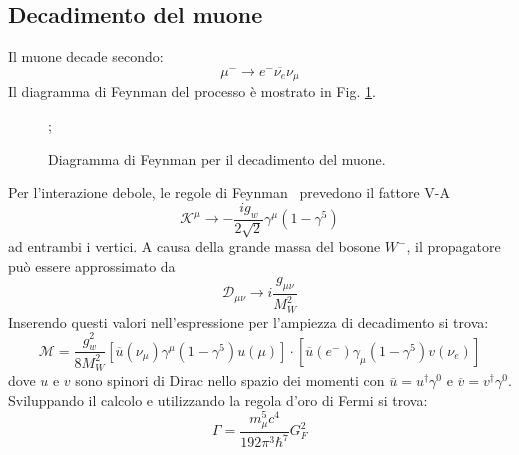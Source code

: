 \documentclass{subnucbo}
\begin{document}
\subsection{Decadimento del muone}
Il muone decade secondo:
\begin{equation}
        \mu^{-} \rightarrow e^{-} \overline{\nu_{e}} \nu_{\mu}
        \label{eq:muon_decay}
\end{equation}
Il diagramma di Feynman del processo è mostrato in Fig. \ref{fig:muon_decay}.
\begin{figure}[!h]
        \centering
        ;
        \caption{Diagramma di Feynman per il decadimento del muone.}
        \label{fig:muon_decay}
\end{figure}
Per l'interazione debole, le regole di Feynman~\cite{ref:griff} prevedono il fattore V-A
\begin{equation}
        \mathcal { K } ^ { \mu } \rightarrow - \frac { i g _ { w } } { 2 \sqrt { 2 } } \gamma ^ { \mu } \left( 1 - \gamma ^ { 5 } \right)
\end{equation}
ad entrambi i vertici. A causa della grande massa del bosone $W^{-}$, il propagatore può essere approssimato da
\begin{equation}
        \mathcal { D } _ { \mu \nu } \rightarrow i \frac { g _ { \mu \nu } } { M _ { W } ^ { 2 } }
        \label{eq:propagator}
\end{equation}
Inserendo questi valori nell'espressione per l'ampiezza di decadimento si trova:
\begin{equation}
        \mathcal { M } = \frac { g _ { w } ^ { 2 } } { 8 M _ { W } ^ { 2 } } \left[ \overline { u } \left( \nu _ { \mu } \right) \gamma ^ { \mu } \left( 1 - \gamma ^ { 5 } \right) u ( \mu ) \right] \cdot \left[ \overline { u } \left( e ^ { - } \right) \gamma _ { \mu } \left( 1 - \gamma ^ { 5 } \right) v \left( \nu _ { e } \right) \right]
        \label{eq:amplitude_muon}
\end{equation}
dove $u$ e $v$ sono spinori di Dirac nello spazio dei momenti con $\overline { u } = u ^ { \dagger } \gamma ^ { 0 }$ e $\overline { v } = v ^ { \dagger } \gamma ^ { 0 }$. Sviluppando il calcolo e utilizzando la regola d'oro di Fermi si trova:
\begin{equation}
        \Gamma = \frac { m _ { \mu } ^ { 5 } c ^ { 4 } } { 192 \pi ^ { 3 } \hbar ^ { 7 } } G _ { F } ^ { 2 }
        \label{eq:muon_decay_rate}
\end{equation}
\end{document}
